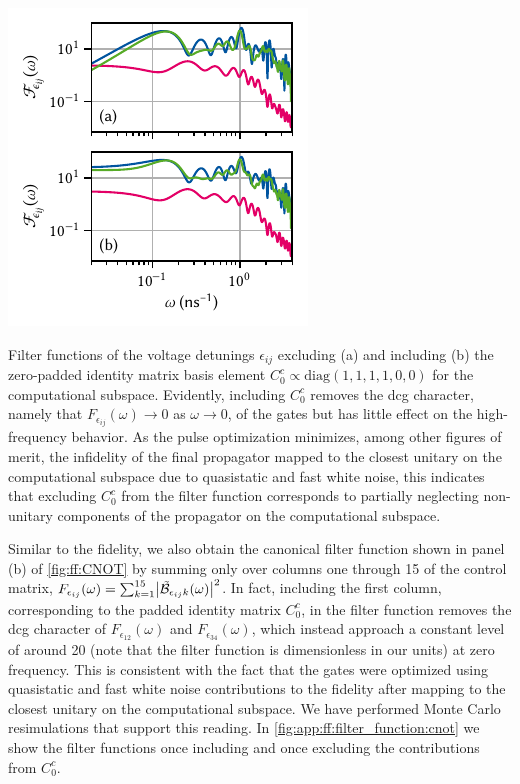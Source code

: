 \begin{marginfigure}
    \centering
    \includegraphics{img/pdf/filter_functions/CNOT_FF_unitary_v_complete}
    \caption[]{
        Filter functions of the voltage detunings $\epsilon_{ij}$ excluding (a) and including (b) the zero-padded identity matrix basis element $C_0^c\propto\text{diag}(1,1,1,1,0,0)$ for the computational subspace.
        Evidently, including $C_0^c$ removes the \gls{dcg} character, namely that $F_{\epsilon_{ij}}(\omega)\rightarrow 0$ as $\omega\rightarrow 0$, of the gates but has little effect on the high-frequency behavior.
        As the pulse optimization minimizes, among other figures of merit, the infidelity of the final propagator mapped to the closest unitary on the computational subspace due to quasistatic and fast white noise, this indicates that excluding $C_0^c$ from the filter function corresponds to partially neglecting non-unitary components of the propagator on the computational subspace.
    }
    \label{fig:app:ff:filter_function:cnot}
\end{marginfigure}

Similar to the fidelity, we also obtain the canonical filter function shown in panel (b) of \cref{fig:ff:CNOT} by summing only over columns one through 15 of the control matrix, $F_{\epsilon_{ij}}(\omega) = \sum_{k=1}^{15}\bigl\lvert\tilde{\mathcal{B}}_{\epsilon_{ij} k}(\omega)\bigr\rvert^2$.
In fact, including the first column, corresponding to the padded identity matrix $C_0^c$, in the filter function removes the \gls{dcg} character of $F_{\epsilon_{12}}(\omega)$ and $F_{\epsilon_{34}}(\omega)$, which instead approach a constant level of around 20 (note that the filter function is dimensionless in our units) at zero frequency.
This is consistent with the fact that the gates were optimized using quasistatic and fast white noise contributions to the fidelity after mapping to the closest unitary on the computational subspace.
We have performed Monte Carlo resimulations that support this reading.
In \cref{fig:app:ff:filter_function:cnot} we show the filter functions once including and once excluding the contributions from $C_0^c$.

